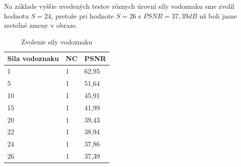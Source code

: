 Na základe vyššie uvedených testov rôznych úrovní sily vodoznaku sme zvolil hodnotu $S=24$, pretože pri hodnote $S=26$ s $PSNR=37,39dB$ už boli jasne zreteľné zmeny v obraze. 
\clearpage

\begin{table}[ht]
\centering
\label{wm-strength}
\begin{tabular}{lll}
\hline
\multicolumn{1}{c}{\textbf{Sila vodoznaku}} & \multicolumn{1}{c}{\textbf{NC}} & \multicolumn{1}{c}{\textbf{PSNR}} \\ \hline
1                              & 1                               & 62,95 \\
5                              & 1                               & 51,64 \\
10                             & 1                               & 45,91 \\
15                             & 1                               & 41,99 \\
20                             & 1                               & 39,43 \\
22                             & 1                               & 38,94 \\
24                             & 1                               & 37,86 \\
26                             & 1                               & 37,39 \\ \hline
\end{tabular}
\caption{Zvolenie sily vodoznaku}
\end{table}

